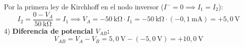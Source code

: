 \begin{ejercicio}
\begin{equation}
\end{equation}
Por la primera ley de Kirchhoff en el nodo inversor ($I^- = 0 \implies I_1 = I_2$):
\begin{equation}
    I_2 = \frac{0 - V_A}{50\ \si{\kilo\ohm}} = I_1 \implies \boxed{V_A = -50\ \si{\kilo\ohm} \cdot I_1 = -50\ \si{\kilo\ohm} \cdot (-0{,}1\ \si{\milli\ampere}) = +5{,}0\ \si{\volt}}
\end{equation}
4) \textbf{Diferencia de potencial $V_{AB}$:}
\begin{equation}
    \boxed{V_{AB} = V_A - V_B = 5{,}0\ \si{\volt} - (-5{,}0\ \si{\volt}) = +10{,}0\ \si{\volt}}
\end{equation}
\end{ejercicio}
